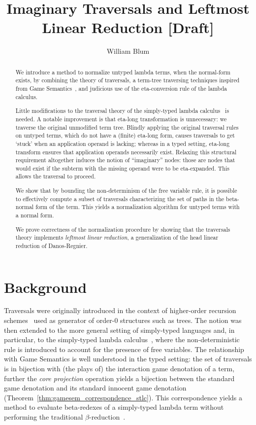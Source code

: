 \documentclass{article}
\author{William Blum}
\title{Imaginary Traversals and Leftmost Linear Reduction [Draft]}
\theoremstyle{definition}
\begin{document}
\maketitle
\begin{abstract}
We introduce a method to normalize untyped lambda terms, when the normal-form exists, by combining the theory of traversals, a term-tree traversing techniques inspired from Game Semantics~\cite{Ong2006,BlumPhd}, and judicious use of the eta-conversion rule of the lambda calculus.

Little modifications to the traversal theory of the simply-typed lambda calculus~\cite{BlumPhd} is needed. A notable improvement is that eta-long transformation is unnecessary: we traverse the original unmodified term tree. Blindly applying the original traversal rules on untyped terms, which do not have a (finite) eta-long form, causes traversals to get `stuck' when an application operand is lacking; whereas in a typed setting, eta-long transform ensures that application operands necessarily exist. Relaxing this structural requirement altogether induces the notion of ``imaginary'' nodes: those are nodes that would exist
 if the subterm with the missing operand were to be eta-expanded. This allows the traversal to proceed.

We show that by bounding the non-determinism of the free variable rule, it is possible to effectively compute a subset of traversals characterizing the set of paths in the beta-normal form of the term. This yields a normalization algorithm for untyped terms with a normal form.

We prove correctness of the normalization procedure by showing that the traversals theory implements \emph{leftmost linear reduction}, a generalization of the head linear reduction of Danos-Regnier\cite{danos-head}.
\end{abstract}

\section{Background}

Traversals were originally introduced in the context of higher-order recursion schemes~\cite{Ong2006} used as generator of order-$0$ structures such as trees.
The notion was then extended to the more general setting of simply-typed languages and, in particular, to the simply-typed lambda calculus~\cite{BlumPhd}, where the non-deterministic rule  is introduced to account for the presence of free variables. The relationship with Game Semantics is well understood in the typed setting: the set of traversals is in bijection with (the plays of) the interaction game denotation of a term, further the \emph{core projection} operation yields a bijection between the standard game denotation and its standard innocent game denotation (Theorem~\ref{thm:gamesem_correspondence_stlc}). This correspondence yields a method to evaluate beta-redexes of a simply-typed lambda term without performing the traditional $\beta$-reduction~\cite{danos-head,BlumPhd,BlumGalop2008, Blum-LocalBeta2008}.
\end{document}
